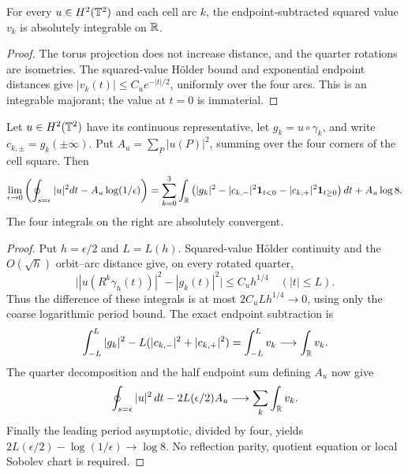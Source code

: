 \begin{lemma}
\label{lem:dd-arc-value-remainder}
\leanok
For every $u\in H^2(\mathbb{T}^2)$ and each cell arc $k$, the endpoint-subtracted
squared value $v_k$ is absolutely integrable on $\mathbb{R}$.
\end{lemma}

\begin{proof}
\leanok
The torus projection does not increase distance, and the quarter rotations
are isometries. The squared-value H\"older bound and exponential endpoint
distances give $|v_k(t)|\le C_u e^{-|t|/2}$, uniformly over the four arcs.
This is an integrable majorant; the value at $t=0$ is immaterial.
\end{proof}

\begin{lemma}
\label{lem:dd-value-finite-part}
\leanok
Let $u\in H^2(\mathbb{T}^2)$ have its continuous representative, let
$g_k=u\circ\gamma_k$, and write $c_{k,\pm}=g_k(\pm\infty)$. Put
$A_u=\sum_P|u(P)|^2$, summing over the four corners of the cell square.
Then
\[
 \lim_{\epsilon\to0}\left(\oint_{s=\epsilon}|u|^2dt
                                -A_u\log(1/\epsilon)\right)
 =\sum_{k=0}^3\int_{\mathbb{R}}\left(|g_k|^2-|c_{k,-}|^2\mathbf1_{t<0}
                                  -|c_{k,+}|^2\mathbf1_{t\ge0}\right)dt
   +A_u\log8.
\]
The four integrals on the right are absolutely convergent.
\end{lemma}

\begin{proof}
\leanok
Put $h=\epsilon/2$ and $L=L(h)$. Squared-value H\"older continuity and
the $O(\sqrt h)$ orbit--arc distance give, on every rotated quarter,
\[
 \big||u(R^k\gamma_h(t))|^2-|g_k(t)|^2\big|\le C_u h^{1/4}
 \quad(|t|\le L).
\]
Thus the difference of these integrals is at most $2C_uLh^{1/4}\to0$,
using only the coarse logarithmic period bound.
The exact endpoint subtraction is
\[
 \int_{-L}^{L}|g_k|^2-L(|c_{k,-}|^2+|c_{k,+}|^2)
 =\int_{-L}^{L}v_k\longrightarrow\int_{\mathbb{R}} v_k.
\]
The quarter decomposition and the half endpoint sum defining $A_u$ now give
\[
 \oint_{s=\epsilon}|u|^2\,dt-2L(\epsilon/2)A_u
 \longrightarrow\sum_k\int_{\mathbb{R}} v_k.
\]
Finally the leading period asymptotic, divided by four, yields
$2L(\epsilon/2)-\log(1/\epsilon)\to\log8$.
No reflection parity, quotient equation or local Sobolev chart is required.
\end{proof}

